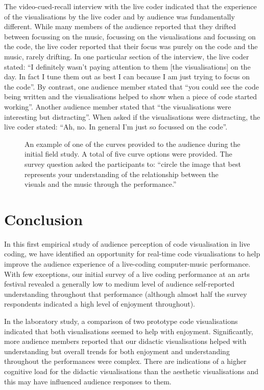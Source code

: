 \documentclass{sig-alternate}
\begin{document}
The video-cued-recall interview with the live coder indicated that the
experience of the visualisations by the live coder and by audience was
fundamentally different. While many members of the audience reported
that they drifted between focussing on the music, focussing on the
visualisations and focussing on the code, the live coder reported that
their focus was purely on the code and the music, rarely drifting. In
one particular section of the interview, the live coder stated: ``I
definitely wasn't paying attention to them [the visualisations] on the
day. In fact I tune them out as best I can because I am just trying to
focus on the code''. By contrast, one audience member stated that
``you could see the code being written and the visualisations helped
to show when a piece of code started working''. Another audience
member stated that ``the visualisations were interesting but
distracting''. When asked if the visualisations were distracting, the
live coder stated: ``Ah, no. In general I'm just so focussed on the
code''.

\begin{figure}
\centering
{}
\caption{An example of one of the curves provided to the audience
during the initial field study. A total of five curve options were
provided. The survey question asked the participants to: ``circle the
image that best represents your understanding of the relationship
between the visuals and the music through the performance.''}
\label{fig:understanding-over-time}
\end{figure}

\section{Conclusion}

In this first empirical study of audience perception of code
visualisation in live coding, we have identified an opportunity for
real-time code visualisations to help improve the audience experience
of a live-coding computer-music performance. With few exceptions, our
initial survey of a live coding performance at an arts festival
revealed a generally low to medium level of audience self-reported
understanding throughout that performance (although almost half the
survey respondents indicated a high level of enjoyment throughout).

In the laboratory study, a comparison of two prototype code
visualisations indicated that both visualisations seemed to help with
enjoyment. Significantly, more audience members reported that our
didactic visualisations helped with understanding but overall trends
for both enjoyment and understanding throughout the performances were
complex. There are indications of a higher cognitive load for the
didactic visualisations than the aesthetic visualisations and this may
have influenced audience responses to them.
\end{document}
